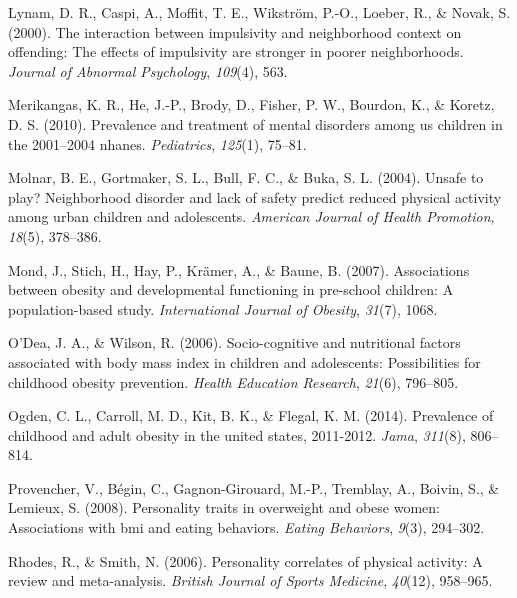 \documentclass[man]{apa6}
\begin{document}
\leavevmode\hypertarget{ref-lynam2000interaction}{}%
Lynam, D. R., Caspi, A., Moffit, T. E., Wikström, P.-O., Loeber, R., \& Novak, S. (2000). The interaction between impulsivity and neighborhood context on offending: The effects of impulsivity are stronger in poorer neighborhoods. \emph{Journal of Abnormal Psychology}, \emph{109}(4), 563.

\leavevmode\hypertarget{ref-merikangas2010prevalence}{}%
Merikangas, K. R., He, J.-P., Brody, D., Fisher, P. W., Bourdon, K., \& Koretz, D. S. (2010). Prevalence and treatment of mental disorders among us children in the 2001--2004 nhanes. \emph{Pediatrics}, \emph{125}(1), 75--81.

\leavevmode\hypertarget{ref-molnar2004unsafe}{}%
Molnar, B. E., Gortmaker, S. L., Bull, F. C., \& Buka, S. L. (2004). Unsafe to play? Neighborhood disorder and lack of safety predict reduced physical activity among urban children and adolescents. \emph{American Journal of Health Promotion}, \emph{18}(5), 378--386.

\leavevmode\hypertarget{ref-mond2007associations}{}%
Mond, J., Stich, H., Hay, P., Krämer, A., \& Baune, B. (2007). Associations between obesity and developmental functioning in pre-school children: A population-based study. \emph{International Journal of Obesity}, \emph{31}(7), 1068.

\leavevmode\hypertarget{ref-o2006socio}{}%
O'Dea, J. A., \& Wilson, R. (2006). Socio-cognitive and nutritional factors associated with body mass index in children and adolescents: Possibilities for childhood obesity prevention. \emph{Health Education Research}, \emph{21}(6), 796--805.

\leavevmode\hypertarget{ref-ogden2014prevalence}{}%
Ogden, C. L., Carroll, M. D., Kit, B. K., \& Flegal, K. M. (2014). Prevalence of childhood and adult obesity in the united states, 2011-2012. \emph{Jama}, \emph{311}(8), 806--814.

\leavevmode\hypertarget{ref-provencher2008personality}{}%
Provencher, V., Bégin, C., Gagnon-Girouard, M.-P., Tremblay, A., Boivin, S., \& Lemieux, S. (2008). Personality traits in overweight and obese women: Associations with bmi and eating behaviors. \emph{Eating Behaviors}, \emph{9}(3), 294--302.

\leavevmode\hypertarget{ref-rhodes2006personality}{}%
Rhodes, R., \& Smith, N. (2006). Personality correlates of physical activity: A review and meta-analysis. \emph{British Journal of Sports Medicine}, \emph{40}(12), 958--965.
\end{document}
